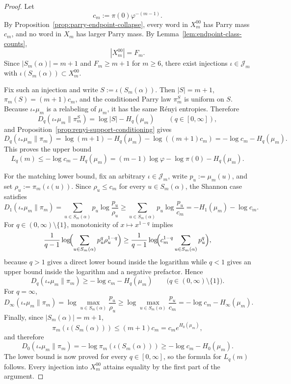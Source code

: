 \begin{proof}
Let
\[
c_m:=\pi(0)\varphi^{-(m-1)}.
\]
By Proposition~\ref{prop:parry-endpoint-collapse}, every word in \(X_m^{00}\)
has Parry mass \(c_m\), and no word in \(X_m\) has larger Parry mass. By
Lemma~\ref{lem:endpoint-class-counts},
\[
|X_m^{00}|=F_m.
\]
Since \(|S_m(\alpha)|=m+1\) and \(F_m\ge m+1\) for \(m\ge 6\), there exist
injections \(\iota\in\mathcal J_m\) with \(\iota(S_m(\alpha))\subset X_m^{00}\).

Fix such an injection and write \(S:=\iota(S_m(\alpha))\). Then \(|S|=m+1\),
\(\pi_m(S)=(m+1)c_m\), and the conditioned Parry law \(\pi_m^S\) is uniform on
\(S\). Because \(\iota_*\mu_m\) is a relabeling of \(\mu_m\), it has the same
R\'enyi entropies. Therefore
\[
D_q(\iota_*\mu_m\|\pi_m^S)=\log|S|-H_q(\mu_m)
\qquad (q\in[0,\infty]),
\]
and Proposition~\ref{prop:renyi-support-conditioning} gives
\[
D_q(\iota_*\mu_m\|\pi_m)
=
\log(m+1)-H_q(\mu_m)-\log((m+1)c_m)
=
-\log c_m-H_q(\mu_m).
\]
This proves the upper bound
\[
L_q(m)\le -\log c_m-H_q(\mu_m)
=(m-1)\log\varphi-\log\pi(0)-H_q(\mu_m).
\]

For the matching lower bound, fix an arbitrary \(\iota\in\mathcal J_m\), write
\(p_u:=\mu_m(u)\), and set \(\rho_u:=\pi_m(\iota(u))\). Since \(\rho_u\le c_m\)
for every \(u\in S_m(\alpha)\), the Shannon case satisfies
\[
D_1(\iota_*\mu_m\|\pi_m)
=
\sum_{u\in S_m(\alpha)}p_u\log\frac{p_u}{\rho_u}
\ge
\sum_{u\in S_m(\alpha)}p_u\log\frac{p_u}{c_m}
=
-H_1(\mu_m)-\log c_m.
\]
For \(q\in(0,\infty)\setminus\{1\}\), monotonicity of \(x\mapsto x^{1-q}\)
implies
\[
\frac{1}{q-1}\log\!\Bigl(\sum_{u\in S_m(\alpha)}p_u^q\rho_u^{1-q}\Bigr)
\ge
\frac{1}{q-1}\log\!\Bigl(c_m^{1-q}\sum_{u\in S_m(\alpha)}p_u^q\Bigr),
\]
because \(q>1\) gives a direct lower bound inside the logarithm while
\(q<1\) gives an upper bound inside the logarithm and a negative prefactor.
Hence
\[
D_q(\iota_*\mu_m\|\pi_m)\ge -\log c_m-H_q(\mu_m)
\qquad \bigl(q\in(0,\infty)\setminus\{1\}\bigr).
\]
For \(q=\infty\),
\[
D_\infty(\iota_*\mu_m\|\pi_m)
=
\log\max_{u\in S_m(\alpha)}\frac{p_u}{\rho_u}
\ge
\log\max_{u\in S_m(\alpha)}\frac{p_u}{c_m}
=
-\log c_m-H_\infty(\mu_m).
\]
Finally, since \(|S_m(\alpha)|=m+1\),
\[
\pi_m(\iota(S_m(\alpha)))\le (m+1)c_m=c_m e^{H_0(\mu_m)},
\]
and therefore
\[
D_0(\iota_*\mu_m\|\pi_m)
=
-\log \pi_m(\iota(S_m(\alpha)))
\ge
-\log c_m-H_0(\mu_m).
\]
The lower bound is now proved for every \(q\in[0,\infty]\), so the formula for
\(L_q(m)\) follows. Every injection into \(X_m^{00}\) attains equality by the
first part of the argument.


\end{proof}

